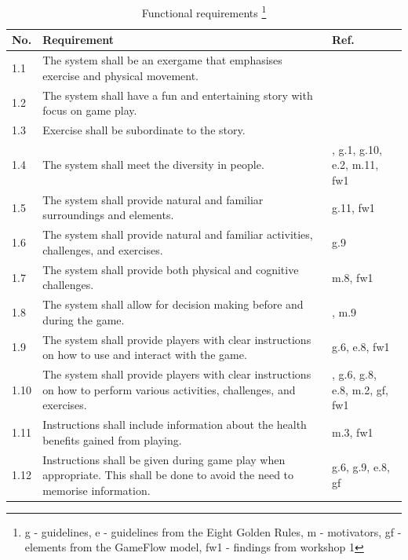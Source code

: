 \begin{minipage}{12 cm}
\begin{table} [H]
\centering
\begin{tabular}{|>{\raggedright}p{}|p{}|p{}|}
\hline
\textbf{No.} & \textbf{Requirement} &  \textbf{Ref.}\\ \hline
1.1 & The system shall be an exergame that emphasises exercise and physical movement. & \cite{project} \\ \hline
1.2 & The system shall have a fun and entertaining story with focus on game play.  & \cite{project} \cite{zyda2005visual} \\ \hline
1.3 & Exercise shall be subordinate to the story. & \cite{zyda2005visual} \\ \hline
1.4 & The system shall meet the diversity in people. & \cite{project}, g.1, g.10, e.2, m.11, fw1 \\ \hline
1.5 & The system shall provide natural and familiar surroundings and elements. & g.11, fw1\\ \hline
1.6 & The system shall provide natural and familiar activities, challenges, and exercises. & g.9 \\ \hline
1.7 & The system shall provide both physical and cognitive challenges. & m.8, fw1 \\ \hline
1.8 & The system shall allow for decision making before and during the game. & \cite{understandingvg}, m.9 \\ \hline
1.9 & The system shall provide players with clear instructions on how to use and interact with the game. & g.6, e.8, fw1 \\ \hline
1.10 & The system shall provide players with clear instructions on how to perform various activities, challenges, and exercises. & \cite{project}, g.6, g.8, e.8, m.2, gf, fw1\\ \hline
1.11 & Instructions shall include information about the health benefits gained from playing. & m.3, fw1\\ \hline
1.12 & Instructions shall be given during game play when appropriate. This shall be done to avoid the need to memorise information. & g.6, g.9, e.8, gf \\ \hline
    \end{tabular}
    \caption[Functional requirements, part 1]{Functional requirements \footnote{g - guidelines, e - guidelines from the Eight Golden Rules, m - motivators, gf - elements from the GameFlow model, fw1 - findings from workshop 1}}
    \label{tab:func1}
\end{table} 
\end{minipage}

